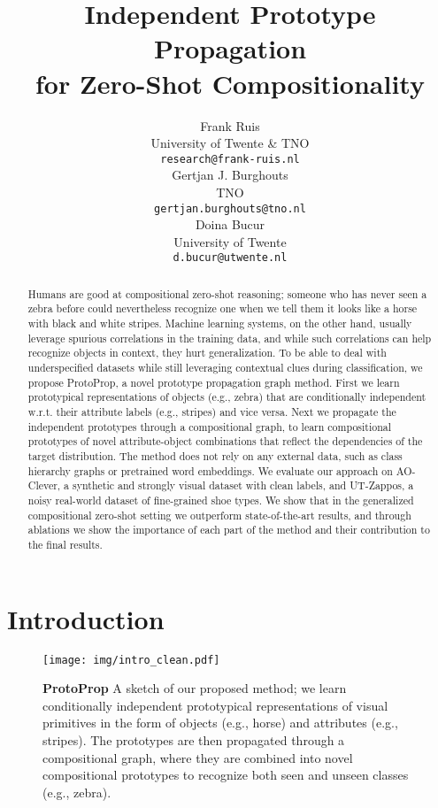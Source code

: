 \documentclass{article}
\title{Independent Prototype Propagation\\ for Zero-Shot Compositionality}
\author{%
  Frank Ruis \\
  University of Twente \& TNO\\
  \texttt{research@frank-ruis.nl} \\
   \And
   Gertjan J. Burghouts \\
   TNO \\
   \texttt{gertjan.burghouts@tno.nl} \\
   \And
   Doina Bucur \\
   University of Twente \\
   \texttt{d.bucur@utwente.nl} \\
}
\begin{document}
\maketitle

\begin{abstract}

Humans are good at compositional zero-shot reasoning; someone who has never seen a zebra before could nevertheless recognize one when we tell them it looks like a horse with black and white stripes. Machine learning systems, on the other hand, usually leverage spurious correlations in the training data, and while such correlations can help recognize objects in context, they hurt generalization. To be able to deal with underspecified datasets while still leveraging contextual clues during classification, we propose ProtoProp, a novel prototype propagation graph method. First we learn prototypical representations of objects (e.g., zebra) that are conditionally independent w.r.t. their attribute labels (e.g., stripes) and vice versa. Next we propagate the independent prototypes through a compositional graph, to learn compositional prototypes of novel attribute-object combinations that reflect the dependencies of the target distribution. The method does not rely on any external data, such as class hierarchy graphs or pretrained word embeddings. We evaluate our approach on AO-Clever, a synthetic and strongly visual dataset with clean labels, and UT-Zappos, a noisy real-world dataset of fine-grained shoe types. We show that in the generalized compositional zero-shot setting we outperform state-of-the-art results, and through ablations we show the importance of each part of the method and their contribution to the final results.

\end{abstract}

\section{Introduction}
\begin{figure}[t]
    \centering
    \texttt{[image: img/intro\_clean.pdf]}
    \caption{\textbf{ProtoProp} A sketch of our proposed method; we learn conditionally independent prototypical representations of visual primitives in the form of objects (e.g., horse) and attributes (e.g., stripes). The prototypes are then propagated through a compositional graph, where they are combined into novel compositional prototypes to recognize both seen and unseen classes (e.g., zebra). }
    \label{fig:intro}
    \medskip
    \small
\end{figure}
\end{document}
